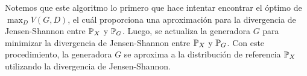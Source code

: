 {{\begin{remark}
    Notemos que este algoritmo lo primero que hace intentar encontrar el óptimo de $\max_D V(G, D)$, el cuál proporciona una aproximación para la divergencia de Jensen-Shannon entre $\Prob_X$ y $\Prob_G$. Luego, se actualiza la generadora $G$ para minimizar la divergencia de Jensen-Shannon entre $\Prob_X$ y $\Prob_G$. Con este procedimiento, la generadora $G$ se aproxima a la distribución de referencia $\Prob_X$ utilizando la divergencia de Jensen-Shannon.
\end{remark}














}  %



}  %